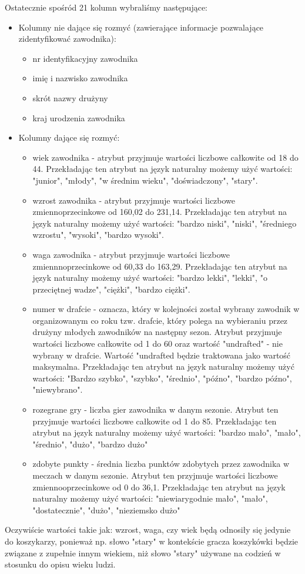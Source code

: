 \documentclass{classrep}
\begin{document}
Ostatecznie spośród 21 kolumn wybraliśmy następujące:
\begin{itemize}
    \item Kolumny nie dające się rozmyć (zawierające informacje pozwalające zidentyfikować zawodnika):
    \begin{itemize}
        \item nr identyfikacyjny zawodnika
        \item imię i nazwisko zawodnika
        \item skrót nazwy drużyny
        \item kraj urodzenia zawodnika
    \end{itemize}
    \item Kolumny dające się rozmyć:
    \begin{itemize}
        \item wiek zawodnika - atrybut przyjmuje wartości liczbowe całkowite od 18 do 44. Przekładając ten atrybut na język naturalny możemy użyć wartości: "junior", "młody", "w średnim wieku", "doświadczony", "stary". 
        \item wzrost zawodnika - atrybut przyjmuje wartości liczbowe zmiennoprzecinkowe od 160,02 do 231,14. Przekładając ten atrybut na język naturalny możemy użyć wartości: "bardzo niski", "niski", "średniego wzrostu", "wysoki", "bardzo wysoki".
        \item waga zawodnika - atrybut przyjmuje wartości liczbowe zmiennnoprzecinkowe od 60,33 do 163,29. Przekładając ten atrybut na język naturalny możemy użyć wartości: "bardzo lekki", "lekki", "o przeciętnej wadze", "ciężki", "bardzo ciężki".
        \item numer w drafcie - oznacza, który w kolejności został wybrany zawodnik w organizowanym co roku tzw. drafcie, który polega na wybieraniu przez drużyny młodych zawodników na następny sezon. Atrybut przyjmuje wartości liczbowe całkowite od 1 do 60 oraz wartość "undrafted" - nie wybrany w drafcie. Wartość "undrafted będzie traktowana jako wartość maksymalna. Przekładając ten atrybut na język naturalny możemy użyć wartości: "Bardzo szybko", "szybko", "średnio", "późno", "bardzo późno", "niewybrano".
        \item rozegrane gry - liczba gier zawodnika w danym sezonie. Atrybut ten przyjmuje wartości liczbowe całkowite od 1 do 85.  Przekładając ten atrybut na język naturalny możemy użyć wartości: "bardzo mało", "mało", "średnio", "dużo", "bardzo dużo"
        \item zdobyte punkty - średnia liczba punktów zdobytych przez zawodnika w meczach w danym sezonie. Atrybut ten przyjmuje wartości liczbowe zmiennooprzecinkowe od 0 do 36,1. Przekładając ten atrybut na język naturalny możemy użyć wartości: "niewiarygodnie mało", "mało", "dostatecznie", "dużo", "nieziemsko dużo"
    \end{itemize}
\end{itemize}
Oczywiście wartości takie jak: wzrost, waga, czy wiek będą odnosiły się jedynie do koszykarzy, ponieważ np. słowo "stary" w kontekście gracza koszykówki będzie związane z zupełnie innym wiekiem, niż słowo "stary" używane na codzień w stosunku do opisu wieku ludzi. \\
\end{document}
